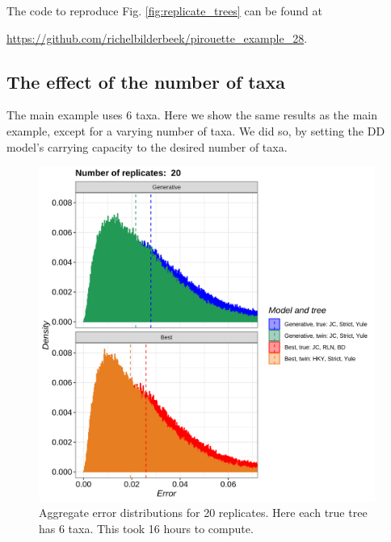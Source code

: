 
The code to reproduce Fig. \ref{fig:replicate_trees} can be found at  
\begin{sloppypar}
  \url{https://github.com/richelbilderbeek/pirouette_example_28}.
\end{sloppypar}

\newpage

\subsection{The effect of the number of taxa}
\label{subsec:n_taxa}

The main example uses 6 taxa. Here we show the same results as the main example,
except for a varying number of taxa. We did so, by setting the DD model's
carrying capacity to the desired number of taxa.

\begin{figure}[H]
  \includegraphics[width=0.98\textwidth]{pirouette_example_28/errors.png}
  \caption{Aggregate error distributions for 20 replicates. Here each true tree has 6 taxa. This took 16 hours to compute.}
  \label{fig:example_6_taxa}
\end{figure}

